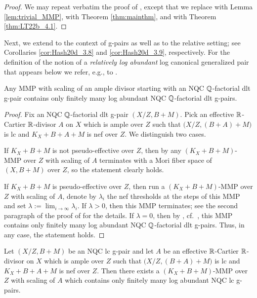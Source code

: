 	\begin{proof}
		We may repeat verbatim the proof of \cite[Lemma 2.9]{LX22a}, except that we replace \cite[Lemma 3.21]{HanLi22} with Lemma \ref{lem:trivial_MMP}, \cite[Theorem 2.24]{HaconLiu21} with Theorem \ref{thm:mainthm}, and \cite[Theorem 4.1]{HanLi22} with Theorem \ref{thm:LT22b_4.1}.
	\end{proof}
	
	Next, we extend \cite[Corollaries 3.8 and 3.9]{Hash20d} to the context of g-pairs as well as to the relative setting; see Corollaries \ref{cor:Hash20d_3.8} and \ref{cor:Hash20d_3.9}, respectively. For the definition of the notion of a \emph{relatively log abundant} log canonical generalized pair that appears below we refer, e.g., to \cite[Subsection 2.3]{Hash20d}.
	
	\begin{cor}\label{cor:Hash20d_3.8}
		Any MMP with scaling of an ample divisor starting with an NQC $ \mathbb{Q} $-factorial dlt g-pair contains only finitely many log abundant NQC $ \mathbb{Q} $-factorial dlt g-pairs.
	\end{cor}
	
	\begin{proof}
		Fix an NQC $ \mathbb{Q} $-factorial dlt g-pair $(X/Z,B+M)$. Pick an effective $\mathbb{R}$-Cartier $\mathbb{R}$-divisor $A$ on $X$ which is ample over $ Z $ such that $ \big(X/Z, (B+A)+M \big) $ is lc and $ K_X+B+A+M $ is nef over $ Z $. We distinguish two cases.
		
		If $ K_X+B+M $ is not pseudo-effective over $ Z $, then by \cite[Lemma 4.4(1)]{BZ16} any $ (K_X+B+M) $-MMP over $ Z $ with scaling of $ A $ terminates with a Mori fiber space of $ (X,B+M) $ over $ Z $, so the statement clearly holds.
		
		If $K_X+B+M$ is pseudo-effective over $ Z $, then run a $ (K_X+B+M) $-MMP over $ Z $ with scaling of $ A $, denote by $ \lambda_i $ the nef thresholds at the steps of this MMP and set $ \lambda := \lim_{i\to \infty} \lambda_i $. If $ \lambda > 0 $, then this MMP terminates; see the second paragraph of the proof of \cite[Lemma 2.10]{LT22b} for the details. If $ \lambda = 0 $, then by \cite[Theorem 7.6]{LX22a}, cf.\ \cite[Theorem 3.15]{Hash22a}, this MMP contains only finitely many log abundant NQC $ \mathbb{Q} $-factorial dlt g-pairs. Thus, in any case, the statement holds.
	\end{proof}
	
	\begin{cor}\label{cor:Hash20d_3.9}
		Let $(X/Z,B+M)$ be an NQC lc g-pair and let $A$ be an effective $\mathbb{R}$-Cartier $\mathbb{R}$-divisor on $X$ which is ample over $ Z $ such that $ \big(X/Z, (B+A)+M \big) $ is lc and $ K_X+B+A+M $ is nef over $ Z $. Then there exists a $(K_X+B+M)$-MMP over $ Z $ with scaling of $A$ which contains only finitely many log abundant NQC lc g-pairs.
	\end{cor}
	
